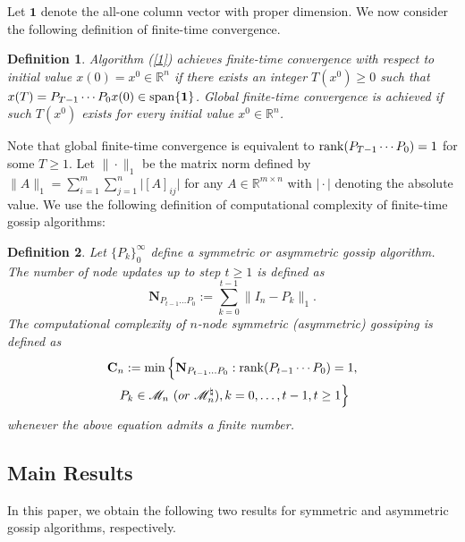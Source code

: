 \documentclass[a4paper, 11pt]{article}
\newtheorem{definition}{Definition}
\begin{document}
Let $\mathbf{1}$ denote the all-one column vector with proper dimension. We now consider the following  definition of finite-time convergence.

\medskip

\begin{definition}
Algorithm   (\ref{1})   achieves {finite-time convergence} with respect to initial value $x(0)=x^0\in \mathbb{R}^n$ if there exists an integer $T(x^0)\geq0$ such that $x(T)=P_{T-1} \cdots P_ 0 x(0)\in {\rm span}\{ \mathbf{1}\}$. \emph{Global finite-time convergence} is achieved  if such $T(x^0)$ exists for every initial value $x^0\in\mathbb{R}^n$.
\end{definition}

\medskip



Note that global finite-time convergence is equivalent to ${\rm rank} (P_{T-1} \cdots P_ 0) =1$ for some $T\geq 1$. Let $\|\cdot \|_1$ be the matrix norm defined by $\|A\|_1=\sum_{i=1}^m \sum_{j=1}^n \big|[A]_{ij}\big|$ for any $A\in \mathbb{R}^{m\times n}$ with $\big|\cdot\big|$ denoting the absolute value. We use the following definition of computational complexity of finite-time gossip algorithms:

\medskip


\begin{definition}
Let $\{P_k\}_0^\infty$ define a symmetric or asymmetric gossip algorithm.   The number of node updates up to step $t\geq 1$ is defined as
$$
\mathbf{N}_{P_{t-1}\dots P_0}:=\sum_{k=0}^{t-1} \|I_n-P_k\|_1.
$$
The computational complexity of $n$-node symmetric (asymmetric) gossiping is defined as
\begin{align*}
&\mathbf{C}_n:=\min\Big\{\mathbf{N}_{P_{t-1}\dots P_0}: {\rm rank} (P_{t-1} \cdots P_ 0) =1, \nonumber\\
 &\ \ \ P_k\in \mathscr{M}_n\ (or\ \mathscr{M}_n^\natural), k=0,\dots,t-1, t\geq 1 \Big\}
\end{align*}
whenever the above equation admits  a finite number.
\end{definition}


\subsection{Main Results}
In this paper, we obtain the following two results for symmetric and asymmetric gossip algorithms, respectively.

\medskip
\end{document}
